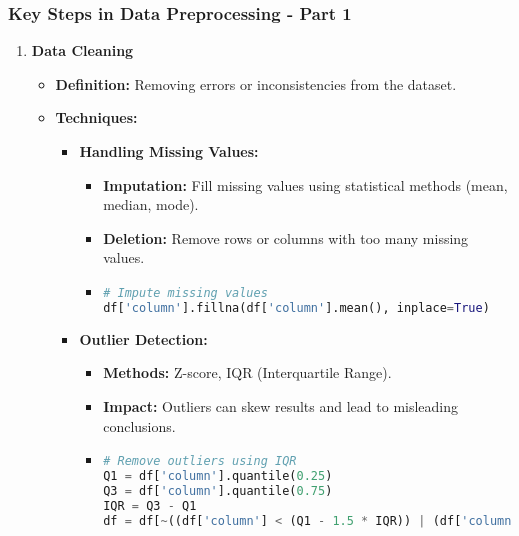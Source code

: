 \documentclass[aspectratio=169]{beamer}
\begin{document}
\begin{frame}
    \frametitle{Key Steps in Data Preprocessing - Part 1}
    \begin{enumerate}
        \item \textbf{Data Cleaning}
        \begin{itemize}
            \item \textbf{Definition:} Removing errors or inconsistencies from the dataset.
            \item \textbf{Techniques:}
            \begin{itemize}
                \item \textbf{Handling Missing Values:}
                \begin{itemize}
                    \item \textbf{Imputation:} Fill missing values using statistical methods (mean, median, mode).
                    \item \textbf{Deletion:} Remove rows or columns with too many missing values.
                    \item \begin{lstlisting}[language=Python]
# Impute missing values
df['column'].fillna(df['column'].mean(), inplace=True)
                    \end{lstlisting}
                \end{itemize}
                \item \textbf{Outlier Detection:}
                \begin{itemize}
                    \item \textbf{Methods:} Z-score, IQR (Interquartile Range).
                    \item \textbf{Impact:} Outliers can skew results and lead to misleading conclusions.
                    \item \begin{lstlisting}[language=Python]
# Remove outliers using IQR
Q1 = df['column'].quantile(0.25)
Q3 = df['column'].quantile(0.75)
IQR = Q3 - Q1
df = df[~((df['column'] < (Q1 - 1.5 * IQR)) | (df['column'] > (Q3 + 1.5 * IQR)))]
                    \end{lstlisting}
                \end{itemize}
            \end{itemize}
        \end{itemize}
    \end{enumerate}
\end{frame}
\end{document}
